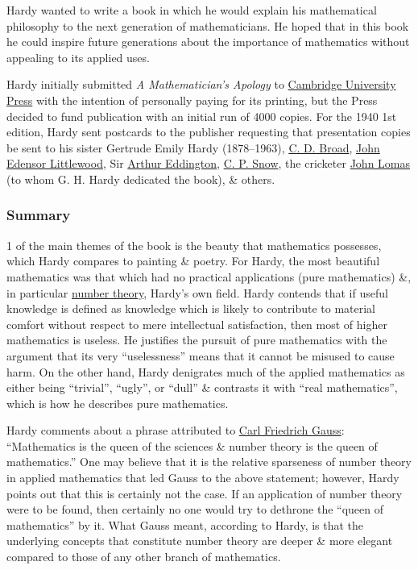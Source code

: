 \documentclass{article}
\begin{document}
{\sc Hardy} wanted to write a book in which he would explain his mathematical philosophy to the next generation of mathematicians. He hoped that in this book he could inspire future generations about the importance of mathematics without appealing to its applied uses.

{\sc Hardy} initially submitted {\it A Mathematician's Apology} to \href{https://en.wikipedia.org/wiki/Cambridge_University_Press}{Cambridge University Press} with the intention of personally paying for its printing, but the Press decided to fund publication with an initial run of 4000 copies. For the 1940 1st edition, {\sc Hardy} sent postcards to the publisher requesting that presentation copies be sent to his sister {\sc Gertrude Emily Hardy} (1878--1963), \href{https://en.wikipedia.org/wiki/C._D._Broad}{\sc C. D. Broad}, \href{https://en.wikipedia.org/wiki/John_Edensor_Littlewood}{\sc John Edensor Littlewood}, Sir \href{https://en.wikipedia.org/wiki/Arthur_Eddington}{\sc Arthur Eddington}, \href{https://en.wikipedia.org/wiki/C._P._Snow}{C. P. Snow}, the cricketer \href{https://en.wikipedia.org/wiki/John_Lomas_(cricketer)}{\sc John Lomas} (to whom {\sc G. H. Hardy} dedicated the book), \& others.

\subsubsection{Summary}
1 of the main themes of the book is the beauty that mathematics possesses, which {\sc Hardy} compares to painting \& poetry. For {\sc Hardy}, the most beautiful mathematics was that which had no practical applications (pure mathematics) \&, in particular \href{https://en.wikipedia.org/wiki/Number_theory}{number theory}, {\sc Hardy}'s own field. {\sc Hardy} contends that if useful knowledge is defined as knowledge which is likely to contribute to material comfort without respect to mere intellectual satisfaction, then most of higher mathematics is useless. He justifies the pursuit of pure mathematics with the argument that its very ``uselessness'' means that it cannot be misused to cause harm. On the other hand, {\sc Hardy} denigrates much of the applied mathematics as either being ``trivial'', ``ugly'', or ``dull'' \& contrasts it with ``real mathematics'', which is how he describes pure mathematics.

{\sc Hardy} comments about a phrase attributed to \href{https://en.wikipedia.org/wiki/Carl_Friedrich_Gauss}{\sc Carl Friedrich Gauss}: ``Mathematics is the queen of the sciences \& number theory is the queen of mathematics.'' One may believe that it is the relative sparseness of number theory in applied mathematics that led {\sc Gauss} to the above statement; however, {\sc Hardy} points out that this is certainly not the case. If an application of number theory were to be found, then certainly no one would try to dethrone the ``queen of mathematics'' by it. What {\sc Gauss} meant, according to {\sc Hardy}, is that the underlying concepts that constitute number theory are deeper \& more elegant compared to those of any other branch of mathematics.
\end{document}
